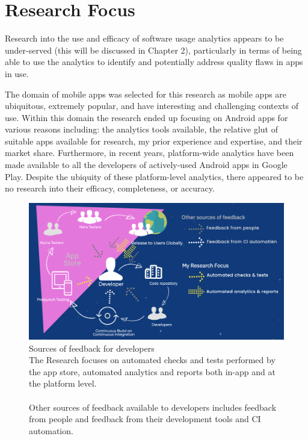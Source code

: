\section{Research Focus}
Research into the use and efficacy of software usage analytics appears to be under-served (this will be discussed in Chapter 2), particularly in terms of being able to use the analytics to identify and potentially address quality flaws in apps in use.

The domain of mobile apps was selected for this research as mobile apps are ubiquitous, extremely popular, and have interesting and challenging contexts of use. Within this domain the research ended up focusing on Android apps for various reasons including: the analytics tools available, the relative glut of suitable apps available for research, my prior experience and expertise, and their market share. Furthermore, in recent years, platform-wide analytics have been made available to all the developers of actively-used Android apps in Google Play. Despite the ubiquity of these platform-level analytics, there appeared to be no research into their efficacy, completeness, or accuracy.

\begin{figure}[htbp!]
    \centering
    \includegraphics[width=15cm]{images/silvias-developer-centric-figure-mobilesoft2020.png}
    \captionsetup{format=hang}
    \caption[Sources of feedback for developers]{Sources of feedback for developers \\The Research focuses on automated checks and tests performed by the app store, automated analytics and reports both in-app and at the platform level. \\ \\Other sources of feedback available to developers includes feedback from people and feedback from their development tools and CI automation.}
    \label{fig:sources-of-feedback-for-developers}
\end{figure}

